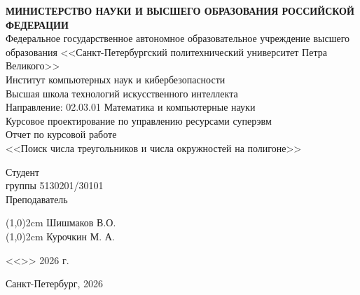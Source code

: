 \documentclass{article}[14pt]
\begin{document}
	
\thispagestyle{empty}
\begin{center}
	\Large {\bfseries МИНИСТЕРСТВО НАУКИ И ВЫСШЕГО ОБРАЗОВАНИЯ РОССИЙСКОЙ ФЕДЕРАЦИИ}
	\\
	\vspace{3mm}
	Федеральное государственное автономное образовательное учреждение высшего образования <<Санкт-Петербургский политехнический университет Петра Великого>>
	\\
	\vspace{3mm}
	Институт компьютерных наук и кибербезопасности
	\\
	\vspace{3mm}
	Высшая школа технологий искусственного интеллекта
	\\
	\vspace{3mm}
	Направление: 02.03.01 Математика и компьютерные науки
	\\
	\vspace{2cm}
	\large{
		Курсовое проектирование по управлению ресурсами суперэвм}
	\\
	\LARGE{
		Отчет по курсовой работе\\
		<<Поиск числа треугольников и числа окружностей на полигоне>>}
\end{center}

\vspace{5.5cm}
\begin{flushleft}
	\Large
	Студент
	\\
	группы 5130201/30101
	\\
	\vspace{2cm}
	\Large
	Преподаватель
	\\ 
\end{flushleft}
\vspace{-4.6cm}
\begin{flushright}
	\Large
	\line(1,0){2cm}
	\hspace{0.4cm}
	Шишмаков В.О.
	\\
	\vspace{2,7cm}
	\hspace{2cm}
	\Large
	\line(1,0){2cm}
	\hspace{0.4cm}
	Курочкин М. А.
	\hspace{-0.1cm}
	
\end{flushright}

\vspace{1cm}
\hspace{9.8cm}
{
	\Large
	\vspace{0.8cm}
	<<\underline{\hspace{1cm}}>>\underline{\hspace{2.5cm}} 2026 г.
}
\hfill \break
\hfill \break
\begin{center} \large{Санкт-Петербург, 2026} \end{center}
\pagebreak
\end{document}
